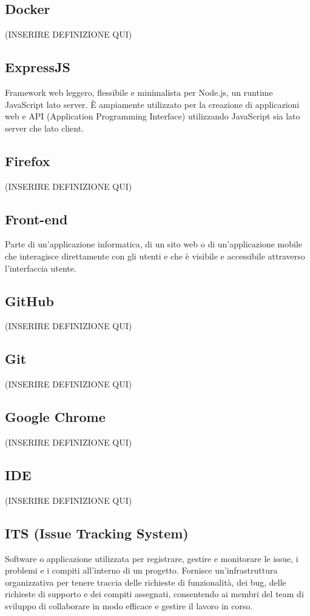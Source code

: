 \subsection{Docker} (INSERIRE DEFINIZIONE QUI)
\subsection{ExpressJS}Framework web leggero, flessibile e minimalista per Node.js, un runtime JavaScript lato server. È ampiamente utilizzato per la creazione di applicazioni web e API (Application Programming Interface) utilizzando JavaScript sia lato server che lato client.
\subsection{Firefox} (INSERIRE DEFINIZIONE QUI)
\subsection{Front-end}Parte di un'applicazione informatica, di un sito web o di un'applicazione mobile che interagisce direttamente con gli utenti e che è visibile e accessibile attraverso l'interfaccia utente.
\subsection{GitHub} (INSERIRE DEFINIZIONE QUI)
\subsection{Git} (INSERIRE DEFINIZIONE QUI)
\subsection{Google Chrome} (INSERIRE DEFINIZIONE QUI)
\subsection{IDE} (INSERIRE DEFINIZIONE QUI)
\subsection{ITS (Issue Tracking System)}Software o applicazione utilizzata per registrare, gestire e monitorare le issue, i problemi e i compiti all'interno di un progetto. Fornisce un'infrastruttura organizzativa per tenere traccia delle richieste di funzionalità, dei bug, delle richieste di supporto e dei compiti assegnati, consentendo ai membri del team di sviluppo di collaborare in modo efficace e gestire il lavoro in corso.
